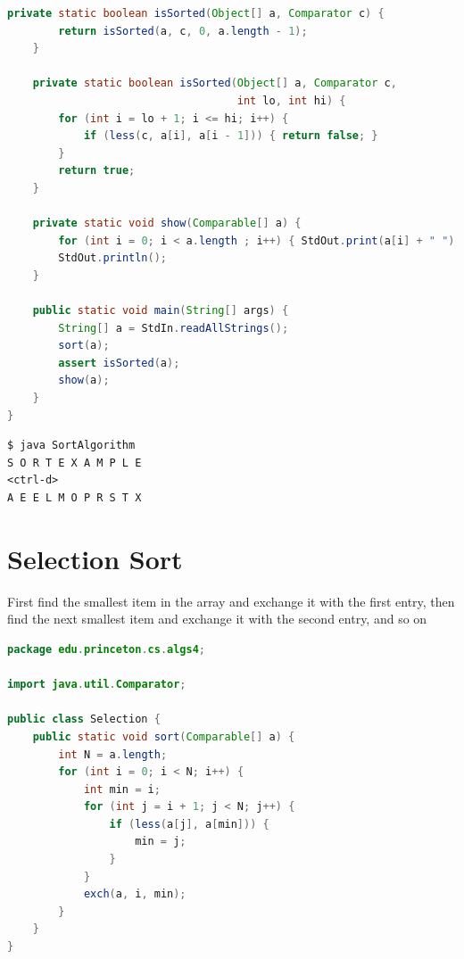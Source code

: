 \documentclass[8pt,a4paper,compress]{beamer}
\begin{document}
\begin{frame}[fragile]
\pause

\begin{lstlisting}[language=Java,style=focusin]
    private static boolean isSorted(Object[] a, Comparator c) {
        return isSorted(a, c, 0, a.length - 1);
    }

    private static boolean isSorted(Object[] a, Comparator c, 
                                    int lo, int hi) {
        for (int i = lo + 1; i <= hi; i++) {
            if (less(c, a[i], a[i - 1])) { return false; }
        }
        return true;
    }
    
    private static void show(Comparable[] a) {
        for (int i = 0; i < a.length ; i++) { StdOut.print(a[i] + " "); }
        StdOut.println();
    }
    
    public static void main(String[] args) {
        String[] a = StdIn.readAllStrings();
        sort(a);
        assert isSorted(a);
        show(a);
    }
}
\end{lstlisting}

\pause
\bigskip

\begin{lstlisting}[language={},style=focusin]
$ java SortAlgorithm
S O R T E X A M P L E
<ctrl-d>
A E E L M O P R S T X
\end{lstlisting}
\end{frame}

\section{Selection Sort}
\begin{frame}[fragile]
\pause

First find the smallest item in the array and exchange it with the first entry, then find the next smallest item and exchange it with the second entry, and so on

\pause
\bigskip

\begin{lstlisting}[language=Java,style=focusin]
package edu.princeton.cs.algs4;

import java.util.Comparator;

public class Selection {
    public static void sort(Comparable[] a) {
        int N = a.length;
        for (int i = 0; i < N; i++) {
            int min = i;
            for (int j = i + 1; j < N; j++) {
                if (less(a[j], a[min])) { 
                    min = j;
                }
            }
            exch(a, i, min);
        }
    }
}
\end{lstlisting}
\end{frame}
\end{document}
